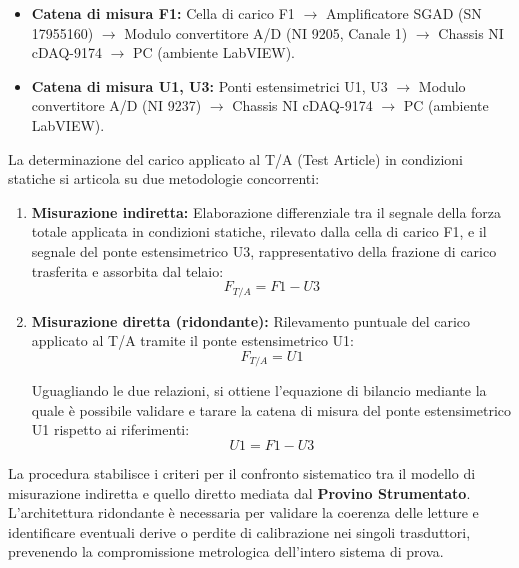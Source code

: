 \documentclass[a4paper, twoside]{article}
\begin{document}
\begin{itemize}
    \item \textbf{Catena di misura F1:} Cella di carico F1 $\rightarrow$ Amplificatore SGAD (SN 17955160) $\rightarrow$ Modulo convertitore A/D (NI 9205, Canale 1) $\rightarrow$ Chassis NI cDAQ-9174 $\rightarrow$ PC (ambiente LabVIEW).
    \item \textbf{Catena di misura U1, U3:} Ponti estensimetrici U1, U3 $\rightarrow$ Modulo convertitore A/D (NI 9237) $\rightarrow$ Chassis NI cDAQ-9174 $\rightarrow$ PC (ambiente LabVIEW).
\end{itemize}

La determinazione del carico applicato al T/A (Test Article) in condizioni statiche si articola su due metodologie concorrenti:

\begin{enumerate}
    \item \textbf{Misurazione indiretta:} Elaborazione differenziale tra il segnale della forza totale applicata in condizioni statiche, rilevato dalla cella di carico F1, e il segnale del ponte estensimetrico U3, rappresentativo della frazione di carico trasferita e assorbita dal telaio:
    \begin{equation}
        F_{T/A} = F1 - U3
    \end{equation}
    
    \item \textbf{Misurazione diretta (ridondante):} Rilevamento puntuale del carico applicato al T/A tramite il ponte estensimetrico U1:
    \begin{equation}
        F_{T/A} = U1
    \end{equation}
    
    Uguagliando le due relazioni, si ottiene l'equazione di bilancio mediante la quale è possibile validare e tarare la catena di misura del ponte estensimetrico U1 rispetto ai riferimenti:
    \begin{equation}
        U1 = F1 - U3
    \end{equation}
\end{enumerate}

La procedura stabilisce i criteri per il confronto sistematico tra il modello di misurazione indiretta e quello diretto mediata dal \textbf{Provino Strumentato}. L'architettura ridondante è necessaria per validare la coerenza delle letture e identificare eventuali derive o perdite di calibrazione nei singoli trasduttori, prevenendo la compromissione metrologica dell'intero sistema di prova.
\end{document}
